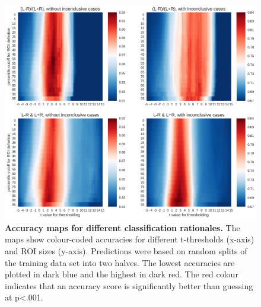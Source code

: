 \documentclass[fleqn,10pt]{SelfArx} %
\begin{document}
\begin{figure}[!htb]
	\begin{minipage}{\textwidth}
		\renewcommand{\familydefault}{\sfdefault}\normalfont
		\centering
		\includegraphics[width=0.8\columnwidth]{../reports/figures/07-training-feature-accuracy.png}
		\caption{\textbf{Accuracy maps for different classification rationales.} The maps show colour-coded accuracies for different t-thresholds (x-axis) and ROI sizes (y-axis). Predictions were based on random splits of the training data set into two halves. The lowest accuracies are plotted in dark blue and the highest in dark red. The red colour indicates that an accuracy score is significantly better than guessing at p<.001.}%
		\label{fig:feats}
	\end{minipage}
\end{figure}
\end{document}

